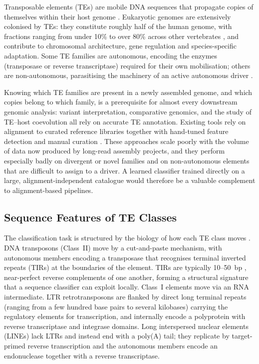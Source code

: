 \documentclass[12pt]{article}
\begin{document}
Transposable elements (TEs) are mobile DNA sequences that propagate copies of themselves within their host genome \cite{mcclintock1950,wells2020field}. Eukaryotic genomes are extensively colonised by TEs: they constitute roughly half of the human genome, with fractions ranging from under 10\% to over 80\% across other vertebrates \cite{wells2020field}, and contribute to chromosomal architecture, gene regulation and species-specific adaptation. Some TE families are autonomous, encoding the enzymes (transposase or reverse transcriptase) required for their own mobilisation; others are non-autonomous, parasitising the machinery of an active autonomous driver \cite{wicker2007unified,wells2020field}.

Knowing which TE families are present in a newly assembled genome, and which copies belong to which family, is a prerequisite for almost every downstream genomic analysis: variant interpretation, comparative genomics, and the study of TE--host coevolution all rely on accurate TE annotation. Existing tools rely on alignment to curated reference libraries together with hand-tuned feature detection and manual curation \cite{smit2015repeatmasker,flynn2020repeatmodeler2}. These approaches scale poorly with the volume of data now produced by long-read assembly projects, and they perform especially badly on divergent or novel families and on non-autonomous elements that are difficult to assign to a driver. A learned classifier trained directly on a large, alignment-independent catalogue would therefore be a valuable complement to alignment-based pipelines.

\subsection{Sequence Features of TE Classes}

The classification task is structured by the biology of how each TE class moves \cite{wicker2007unified,wells2020field}. DNA transposons (Class~II) move by a cut-and-paste mechanism, with autonomous members encoding a transposase that recognises terminal inverted repeats (TIRs) at the boundaries of the element. TIRs are typically 10--50~bp \cite{wicker2007unified}, near-perfect reverse complements of one another, forming a structural signature that a sequence classifier can exploit locally. Class~I elements move via an RNA intermediate. LTR retrotransposons are flanked by direct long terminal repeats (ranging from a few hundred base pairs to several kilobases) \cite{wicker2007unified} carrying the regulatory elements for transcription, and internally encode a polyprotein with reverse transcriptase and integrase domains. Long interspersed nuclear elements (LINEs) lack LTRs and instead end with a poly(A) tail; they replicate by target-primed reverse transcription and the autonomous members encode an endonuclease together with a reverse transcriptase.
\end{document}
